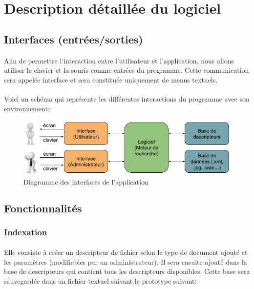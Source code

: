 \documentclass[../main.tex]{subfiles}
\begin{document}
    
    \section{Description détaillée du logiciel}
    \subsection{Interfaces (entrées/sorties)}
    \paragraph{}
    Afin de permettre l'interaction entre l’utilisateur et l’application, nous allons utiliser le clavier et la souris comme entrées du programme. Cette communication sera appelée interface et sera constituée uniquement de menus textuels.

    \paragraph{}
    Voici un schéma qui représente les différentes interactions du programme avec son environnement:

    \begin{figure}[h]
        \begin{center}
            \includegraphics[scale=0.6]{assets/diagrams/pfr_entrees_sorties.png}
            \caption{Diagramme des interfaces de l'application}
        \end{center}
    \end{figure}

    \subsection{Fonctionnalités}
    \subsubsection{Indexation}
    \paragraph{}
    Elle consiste à créer un descripteur de fichier selon le type de document ajouté et les paramètres (modifiables par un administrateur). Il sera ensuite ajouté dans la base de descripteurs qui contient tous les descripteurs disponibles. Cette base sera sauvegardée dans un fichier textuel suivant le prototype suivant:
\end{document}
